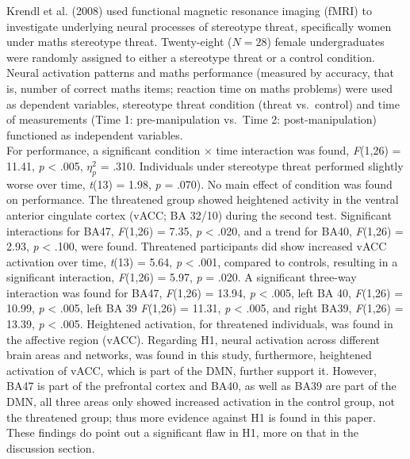 \documentclass[
  stu, a4paper,floatsintext]{apa7}
\begin{document}
Krendl et al. (2008) used functional magnetic resonance imaging (fMRI) to investigate underlying neural processes of stereotype threat, specifically women under maths stereotype threat.
Twenty-eight (\(N = 28\)) female undergraduates were randomly assigned to either a stereotype threat or a control condition.
Neural activation patterns and maths performance (measured by accuracy, that is, number of correct maths items; reaction time on maths problems) were used as dependent variables, stereotype threat condition (threat vs.~control) and time of measurements (Time 1: pre-manipulation vs.~Time 2: post-manipulation) functioned as independent variables.\\
For performance, a significant condition \(\times\) time interaction was found, \emph{F}(1,26) = 11.41, \emph{p} \textless{} .005, \(\eta^{2}_{p}\) = .310.
Individuals under stereotype threat performed slightly worse over time, \emph{t}(13) = 1.98, \emph{p} = .070).
No main effect of condition was found on performance.
The threatened group showed heightened activity in the ventral anterior cingulate cortex (vACC; BA 32/10) during the second test.
Significant interactions for BA47, \emph{F}(1,26) = 7.35, \emph{p} \textless{} .020, and a trend for BA40, \emph{F}(1,26) = 2.93, \emph{p} \textless{} .100, were found.
Threatened participants did show increased vACC activation over time, \emph{t}(13) = 5.64, \emph{p} \textless{} .001, compared to controls, resulting in a significant interaction, \emph{F}(1,26) = 5.97, \emph{p} = .020.
A significant three-way interaction was found for BA47, \emph{F}(1,26) = 13.94, \emph{p} \textless{} .005, left BA 40, \emph{F}(1,26) = 10.99, \emph{p} \textless{} .005, left BA 39 \emph{F}(1,26) = 11.31, \emph{p} \textless{} .005, and right BA39, \emph{F}(1,26) = 13.39, \emph{p} \textless{} .005.
Heightened activation, for threatened individuals, was found in the affective region (vACC).
Regarding H1, neural activation across different brain areas and networks, was found in this study, furthermore, heightened activation of vACC, which is part of the DMN, further support it.
However, BA47 is part of the prefrontal cortex and BA40, as well as BA39 are part of the DMN, all three areas only showed increased activation in the control group, not the threatened group; thus more evidence against H1 is found in this paper.
These findings do point out a significant flaw in H1, more on that in the discussion section.
\end{document}
